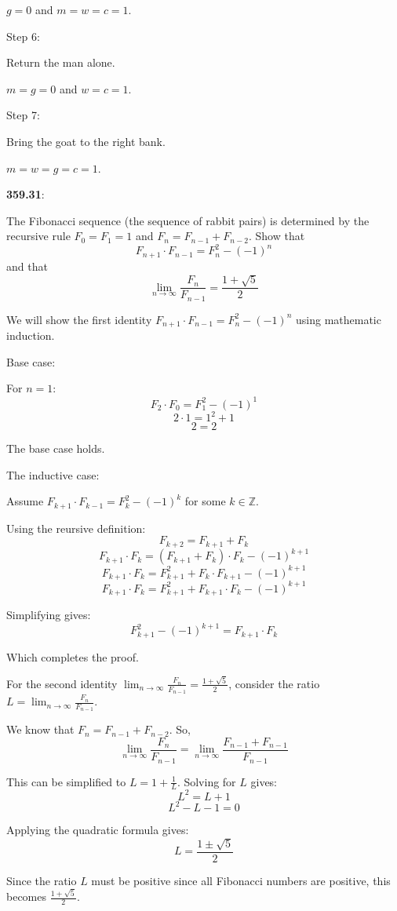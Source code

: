 \documentclass{article}
\newcommand{\ZZ}{\mathbb{Z}}
\begin{document}
$g = 0$ and $m = w = c = 1$.

Step 6:

Return the man alone.

$m = g = 0$ and $w = c = 1$.

Step 7:

Bring the goat to the right bank.

$m = w = g = c = 1$.


\textbf{359.31}:

The Fibonacci sequence (the sequence of rabbit pairs) is
determined by the recursive rule $F_0 = F_1 = 1$ and $F_n = F_{n-1} + F_{n-2}$.
Show that
\[F_{n+1} \cdot F_{n-1} = F_{n}^2 - (-1)^n\]
and that
\[\lim_{n \to \infty} \frac{F_{n}}{F_{n-1}} = \frac{1 + \sqrt{5}}{2}\]

We will show the first identity $F_{n+1} \cdot F_{n-1} = F_{n}^2 - (-1)^n$
using mathematic induction.

Base case:

For $n=1$:
\[F_2 \cdot F_0 = F_1^2 - (-1)^1\]
\[2 \cdot 1 = 1^2 + 1\]
\[2 = 2\]

The base case holds.

The inductive case:

Assume $F_{k+1} \cdot F_{k-1} = F_{k}^2 - (-1)^k$ for some $k \in \ZZ$.

Using the reursive definition:
\[F_{k+2} = F_{k+1} + F_{k}\]
\[F_{k+1} \cdot F_{k} = (F_{k+1} + F_{k}) \cdot F_k - (-1)^{k+1}\]
\[F_{k+1} \cdot F_k = F_{k+1}^2 + F_k \cdot F_{k+1} - (-1)^{k+1}\]
\[F_{k+1} \cdot F_k = F_{k+1}^2 + F_{k+1} \cdot F_k - (-1)^{k+1}\]

Simplifying gives:
\[F_{k+1}^2 - (-1)^{k+1} = F_{k+1} \cdot F_k\]

Which completes the proof.


For the second identity $\lim_{n \to \infty} \frac{F_n}{F_{n-1}} = \frac{1 + \sqrt{5}}{2}$,
consider the ratio $L = \lim_{n \to \infty} \frac{F_n}{F_{n-1}}$.

We know that $F_n = F_{n-1} + F_{n-2}$. So,
\[\lim_{n \to \infty} \frac{F_n}{F_{n-1}} = \lim_{n \to \infty} \frac{F_{n-1} + F_{n-1}}{F_{n-1}}\]

This can be simplified to $L = 1 + \frac{1}{L}$. Solving for $L$ gives:
\[L^2 = L + 1\]
\[L^2 - L - 1 = 0\]

Applying the quadratic formula gives:
\[L = \frac{1 \pm \sqrt{5}}{2}\]

Since the ratio $L$ must be positive since all Fibonacci numbers are positive,
this becomes $\frac{1 + \sqrt{5}}{2}$.
\end{document}
